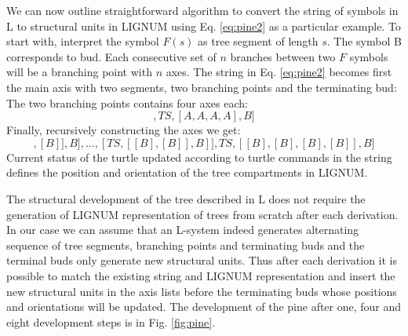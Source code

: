We can now outline straightforward  algorithm to convert the string of
symbols in L to structural units in LIGNUM using Eq. \ref{eq:pine2} as
a particular example.   To start with, interpret the  symbol $F(s)$ as
tree segment  of length $s$.  The  symbol B corresponds  to bud.  Each
consecutive  set of $n$  branches between  two $F$  symbols will  be a
branching  point with  $n$ axes.   The string  in  Eq.  \ref{eq:pine2}
becomes first  the main axis  with two segments, two  branching points
and the terminating bud:
\begin{equation}
[TS, BP, TS, BP, B]
\end{equation}
The two branching points contains four axes each:
\begin{equation}
[TS, [A,A,A,A], TS, [A,A,A,A], B]
\end{equation}
Finally, recursively constructing the axes we get:
\begin{equation}
[TS, [TS,[[B],[B]],B],\ldots, [TS,[[B],[B]],B]], TS, [[B],[B],[B],[B]], B]
\end{equation}
Current status of  the turtle updated according to  turtle commands in
the  string   defines  the  position  and  orientation   of  the  tree
compartments in LIGNUM.

The structural development of the tree described in L does not require
the generation  of LIGNUM representation  of trees from  scratch after
each derivation.   In our case we  can assume that  an L-system indeed
generates alternating sequence of  tree segments, branching points and
terminating buds  and the terminal  buds only generate  new structural
units.   Thus  after each  derivation  it  is  possible to  match  the
existing  string   and  LIGNUM  representation  and   insert  the  new
structural units in  the axis lists before the  terminating buds whose
positions and  orientations will be  updated.  The development  of the
pine  after  one,  four  and   eight  development  steps  is  in  Fig.
\ref{fig:pine}.



